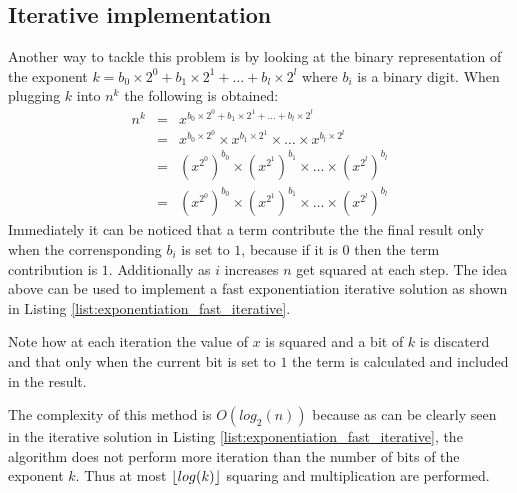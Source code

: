 \subsection{Iterative implementation}
Another way to tackle this problem is by looking at the binary representation of the exponent $k = b_0 \times 2^0 + b_1 \times 2^1 + \ldots + b_l \times 2^l$ where $b_i$ is a binary digit. 
When plugging $k$ into $n^k$ the following is obtained:
\[
\begin{array}{lcl}
n^k & = &  x^{b_0 \times 2^0 + b_1 \times 2^1 + \ldots + b_l \times 2^l} \\
& = & x^{b_0 \times 2^0} \times x^{b_1 \times 2^1} \times \ldots \times x^{b_l \times 2^l} \\
& = & (x^{2^0})^{b_0} \times  (x^{2^1})^{b_1} \times \ldots \times (x^{2^l})^{b_l} \\
& = & (x^{2^0})^{b_0} \times  (x^{2^1})^{b_1} \times \ldots \times (x^{2^l})^{b_l} 
\end{array}
\]
Immediately it can be noticed that a term contribute the the final result only when the corrensponding $b_i$ is set to $1$, because if it is $0$ then the term contribution is $1$. Additionally as $i$ increases $n$ get squared at each step.
The idea above can be used to implement a fast exponentiation iterative solution as shown in Listing \ref{list:exponentiation_fast_iterative}.

Note how at each iteration the value of $x$ is squared and a bit of $k$ is discaterd and that only when the current bit is set to $1$ the term is calculated and included in the result. 

The complexity of this method is $O(log_2(n))$ because as can be clearly seen in the iterative solution in Listing \ref{list:exponentiation_fast_iterative}, the algorithm does not perform more iteration than the number of bits of the exponent $k$.
Thus at most $\lfloor log(k)\rfloor$ squaring and multiplication are performed.